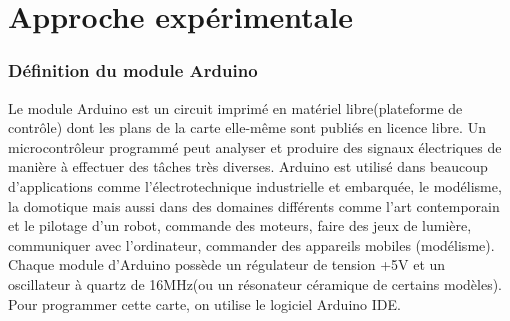 \documentclass[12pt, openany]{report}
\begin{document}
 \chapter{Approche expérimentale}


 \subsection{Définition du module Arduino}
 \large
Le module Arduino est un circuit imprimé en matériel libre(plateforme de contrôle) dont les plans de la carte elle-même sont publiés en
licence libre. Un microcontrôleur programmé peut analyser et produire des signaux électriques de manière à effectuer des tâches très
diverses. Arduino est utilisé dans beaucoup d'applications comme l'électrotechnique industrielle et embarquée, le modélisme, la domotique
mais aussi dans des domaines différents comme l'art contemporain et le pilotage d'un robot, commande des moteurs, faire des jeux de
lumière, communiquer avec l'ordinateur, commander des appareils mobiles (modélisme). Chaque module d'Arduino possède un régulateur de
tension +5V et un oscillateur à quartz de 16MHz(ou un résonateur céramique de certains modèles). Pour programmer cette carte, on utilise
le logiciel Arduino IDE.
\end{document}
